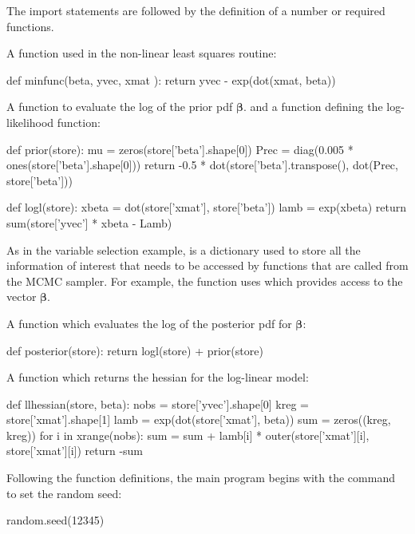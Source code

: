 \documentclass[article]{jss}
\begin{document}
The import statements are followed by the definition of a number or
required functions.

A function  used in the non-linear least squares routine:
\begin{Code}
def minfunc(beta, yvec, xmat ):
    return yvec - exp(dot(xmat, beta))
\end{Code}

A function  to evaluate the log of the prior pdf
$\bm{\beta}.$ and a function  defining the log-likelihood
function:

\begin{Code}
def prior(store):
    mu = zeros(store['beta'].shape[0])
    Prec = diag(0.005 * ones(store['beta'].shape[0]))
    return -0.5 * dot(store['beta'].transpose(), dot(Prec, store['beta']))

def logl(store):
    xbeta = dot(store['xmat'], store['beta'])
    lamb = exp(xbeta)
    return sum(store['yvec'] * xbeta - Lamb)
\end{Code}

As in the variable selection example,  is a
 dictionary used to store all the information of
interest that needs to be accessed by functions that are called from
the MCMC sampler. For example, the function  uses
 which provides access to the vector $\bm{\beta}.$


A function  which evaluates the log
of the posterior pdf for $\bm{\beta}$:

\begin{Code}
def posterior(store):
    return logl(store) + prior(store)
\end{Code}

A function  which returns the hessian for the
log-linear model:

\begin{Code}
def llhessian(store, beta):
    nobs = store['yvec'].shape[0]
    kreg = store['xmat'].shape[1]
    lamb = exp(dot(store['xmat'], beta))
    sum = zeros((kreg, kreg))
    for i in xrange(nobs):
        sum = sum + lamb[i] * outer(store['xmat'][i], store['xmat'][i])
    return -sum
\end{Code}

Following the function definitions, the main program begins with the
command to set the random seed:
\begin{Code}
random.seed(12345)      
\end{Code}
\end{document}
